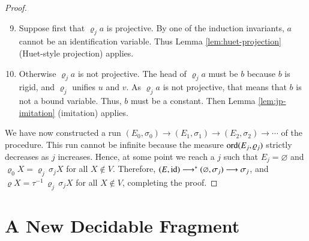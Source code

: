 \begin{proof}
\begin{description}
    \begin{enumerate}
    \setcounter{enumi}{8}
    \item Suppose first that $\varrho_j a$ is projective.
    By one of the induction invariants, $a$ cannot be an identification variable.
    Thus Lemma \ref{lem:huet-projection} (Huet-style projection) applies.
    
    \item Otherwise $\varrho_j a$ is not projective. 
    The head of $\varrho_j a$ must be $b$ because $b$ is rigid, and $\varrho_j$ unifies $u$ and $v$. 
    As $\varrho_j a$ is not projective, that means that $b$ is not a bound variable. 
    Thus, $b$ must be a constant.
    Then Lemma \ref{lem:jp-imitation} (imitation) applies.
    \end{enumerate}
    
  \end{description}
We have now constructed a run 
$(E_{0},\sigma_{0})\longrightarrow(E_{1},\sigma_{1})\longrightarrow(E_{2},\sigma_{2})\longrightarrow\cdots$
of the procedure. 
This run cannot be infinite because the measure $\operatorname{ord}(E_j,\varrho_{j})$
strictly decreases as $j$ increases.
Hence, at some point we reach a $j$ such
that $E_{j}=\varnothing$ and $\varrho_{0} X = \varrho_{j}\,\sigma_{j} X$ for all $X \not\in V$.
Therefore, 
$(E,\operatorname{id})\longrightarrow^*(\varnothing,\sigma_{j})\longrightarrow\sigma_j$,
and $\varrho X = \tau^{-1}\,\varrho_{j}\,\sigma_{j} X$ for all $X \not\in V$,
completing the proof. \qedhere
    \end{proof}

\section{A New Decidable Fragment}
\label{sec:unif:solid-oracle}

